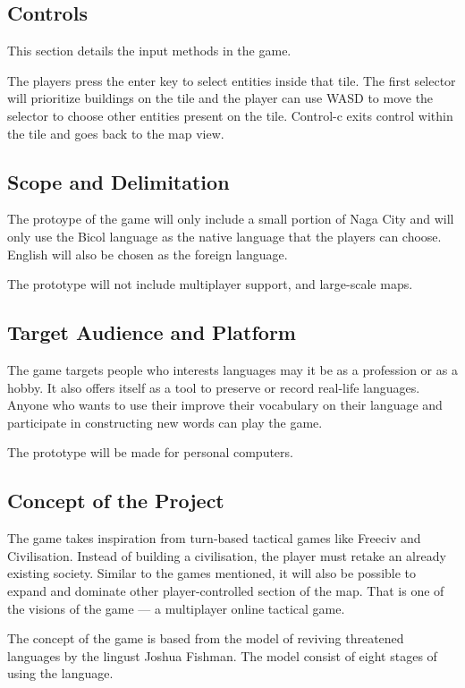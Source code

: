 \documentclass[11pt]{article}
\begin{document}
\subsection{Controls}
This section details the input methods in the game.

The players press the enter key to select entities inside that tile. The first selector will prioritize buildings on the tile and the player can use WASD to move the selector to choose other entities present on the tile. Control-c exits control within the tile and goes back to the map view.

\subsection{Scope and Delimitation}
The protoype of the game will only include a small portion of Naga City and will only use the Bicol language as the native language that the players can choose. English will also be chosen as the foreign language.

The prototype will not include multiplayer support, and large-scale maps.



\subsection{Target Audience and Platform}
The game targets people who interests languages may it be as a profession or as a hobby. It also offers itself as a tool to preserve or record real-life languages. Anyone who wants to use their improve their vocabulary on their language and participate in constructing new words can play the game.

The prototype will be made for personal computers.

\subsection{Concept of the Project}
The game takes inspiration from turn-based tactical games like Freeciv and Civilisation. Instead of building a civilisation, the player must retake an already existing society. Similar to the games mentioned, it will also be possible to expand and dominate other player-controlled section of the map. That is one of the visions of the game --- a multiplayer online tactical game.

The concept of the game is based from the model of reviving threatened languages by the lingust Joshua Fishman. The model consist of eight stages of using the language.
\end{document}
